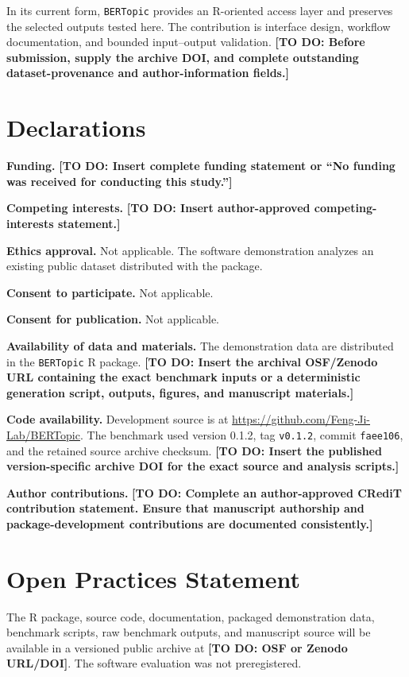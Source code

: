 \documentclass[12pt]{article}
\newcommand{\pkg}[1]{\texttt{#1}}
\newcommand{\fcode}[1]{\nolinkurl{#1}}
\newcommand{\todo}[1]{\textbf{[TO DO: #1]}}
\begin{document}
In its current form, \pkg{BERTopic} provides an R-oriented access layer and preserves the selected outputs tested here. The contribution is interface design, workflow documentation, and bounded input--output validation. \todo{Before submission, supply the archive DOI, and complete outstanding dataset-provenance and author-information fields.}

\section*{Declarations}

\textbf{Funding.} \todo{Insert complete funding statement or ``No funding was received for conducting this study.''}

\textbf{Competing interests.} \todo{Insert author-approved competing-interests statement.}

\textbf{Ethics approval.} Not applicable. The software demonstration analyzes an existing public dataset distributed with the package.

\textbf{Consent to participate.} Not applicable.

\textbf{Consent for publication.} Not applicable.

\textbf{Availability of data and materials.} The demonstration data are distributed in the \pkg{BERTopic} R package. \todo{Insert the archival OSF/Zenodo URL containing the exact benchmark inputs or a deterministic generation script, outputs, figures, and manuscript materials.}

\textbf{Code availability.} Development source is at \url{https://github.com/Feng-Ji-Lab/BERTopic}. The benchmark used version 0.1.2, tag \fcode{v0.1.2}, commit \fcode{faee106}, and the retained source archive checksum. \todo{Insert the published version-specific archive DOI for the exact source and analysis scripts.}

\textbf{Author contributions.} \todo{Complete an author-approved CRediT contribution statement. Ensure that manuscript authorship and package-development contributions are documented consistently.}

\section*{Open Practices Statement}

The R package, source code, documentation, packaged demonstration data, benchmark scripts, raw benchmark outputs, and manuscript source will be available in a versioned public archive at \todo{OSF or Zenodo URL/DOI}. The software evaluation was not preregistered.

\printbibliography
\end{document}
